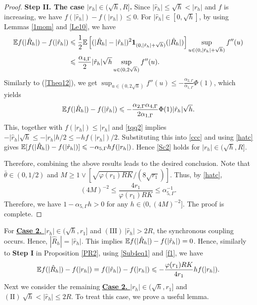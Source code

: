 \documentclass[aap]{imsart}
\theoremstyle{plain}
\theoremstyle{definition}
\begin{document}
\begin{proof}
{\bf Step II. The case $|r_h|\in(\sqrt h,R]$.} Since $|\hat r_h|\leqslant \sqrt h<|r_h|$ and $f$ is increasing, we have \(f(|\hat r_h|)-f(|r_h|)\leqslant 0\). For $|\hat{r}_h|\in [0, \sqrt{h}]$, by using Lemmas \ref{1mom} and \ref{Le10}, we have 
\begin{align*}
\mathbb{E} f(|\hat{R}_h|)-f(|\hat{r}_h|)
&\leqslant \frac{1}{2}\mathbb{E}\left[(|\hat{R}_h|-|\hat{r}_h|)^2{\bf 1}_{(0, |\hat{r}_h|+\sqrt{h})}(|\hat{R}_h|)\right]\sup_{u\in(0, |\hat{r}_h|+\sqrt{h})}f''(u)\\
&\leqslant \frac{\alpha_{4, \Gamma}}{2}|\hat{r}_h|\sqrt{h}\sup_{u\in(0,2\sqrt{h})}f''(u).
\end{align*}
Similarly to (\ref{Theq12}), we get \(\sup_{u\in(0, 2\sqrt{h})}f''(u)\leqslant -\frac{\alpha_{2, \Gamma}}{\alpha_{1, \Gamma}}\Phi(1)\),
which yields
\begin{equation}\label{ccc}
\mathbb{E} f(|\hat{R}_h|)-f(|\hat{r}_h|)\leqslant -\frac{\alpha_{2, \Gamma}\alpha_{4, \Gamma}}{2\alpha_{1, \Gamma}}\Phi(1)|\hat{r}_h|\sqrt{h}.
\end{equation}
This, together with $f(|r_h|)\leqslant |r_h|$ and \eqref{tqq2} implies
$-|\hat{r}_h|\sqrt{h}\leqslant -|r_h| h/2\leqslant -h f(|r_h|)/2$. Substituting this into \eqref{ccc} and using \eqref{hatc} gives \(\mathbb{E}[f(|\hat{R}_h|)-f(|\hat{r}_h|)]\leqslant-\alpha_{5, \Gamma}hf(|r_h|)\). Hence \eqref{Sc2} holds for $|r_h|\in(\sqrt{h}, R]$. 

Therefore, combining the above results leads to the desired conclusion. 
Note that $\bar{\theta}\in(0, 1/2)$ and $M\geqslant 1\vee [\sqrt{\varphi(r_1)RK}/(8\sqrt{r_1})]$. Thus, by \eqref{hatc}, \[(4M)^{-2}\leqslant \frac{4r_1}{\varphi(r_1)RK}\leqslant \alpha_{5, \Gamma}^{-1}.\]  
Therefore, we have $1-\alpha_{5, \Gamma}h>0$ for any $h\in(0, (4M)^{-2}]$. The proof is complete.
\end{proof}
			
For \underline{\bf{Case 2. \textit{$|r_h|\in(\sqrt{h}, r_1]$}}} and \underline{$(\mathrm{III})~|\hat{r}_h|>2R$}, the synchronous coupling occurs. Hence, $|\hat{R}_h| = |\hat{r}_h|$. This implies $\mathbb{E} f(|\hat{R}_h|)-f(|\hat{r}_h|) = 0$. Hence, similarly to {\bf Step I} in Proposition \ref{PR2}, using \eqref{Sub4eq1} and \eqref{f1}, we have
\begin{equation}\label{I-3}
\mathbb{E} f(|\hat{R}_h|)-f(|r_h|) =f(|\hat{r}_h|)-f(|r_h|) \leqslant -\frac{\varphi(r_1)R K}{4r_1}hf(|r_h|).
\end{equation}
Next we consider the remaining \underline{\bf{Case 2. \textit{ $|r_h|\in(\sqrt{h}, r_1]$}}} and \underline{$(\mathrm{II})~\sqrt{h}<|\hat{r}_h|\leqslant 2R$}. To treat this case, we prove a useful lemma.
\end{document}

